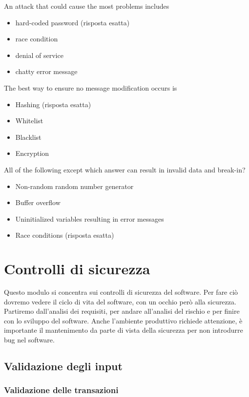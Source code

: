 An attack that could cause the most problems includes
\begin{itemize}
\item hard-coded password (risposta esatta)
\item race condition
\item denial of service
\item chatty error message
\end{itemize}

The best way to ensure no message modification occurs is
\begin{itemize}
\item Hashing (risposta esatta)
\item Whitelist
\item Blacklist
\item Encryption
\end{itemize}


All of the following except which answer can result in invalid data and 
break-in?
\begin{itemize}
\item Non-random random number generator
\item Buffer overflow
\item Uninitialized variables resulting in error messages
\item Race conditions (risposta esatta)
\end{itemize}


\part{Controlli di sicurezza}

Questo modulo si concentra sui controlli di sicurezza del software. Per fare ciò 
dovremo vedere il ciclo di vita del software, con un occhio però alla sicurezza.
Partiremo dall'analisi dei requisiti, per andare all'analisi del rischio e per 
finire con lo sviluppo del software.
Anche l'ambiente produttivo richiede attenzione, è importante il mantenimento da 
parte di vista della sicurezza per non introdurre bug nel software.

\chapter{Validazione degli input}

\section{Validazione delle transazioni}

